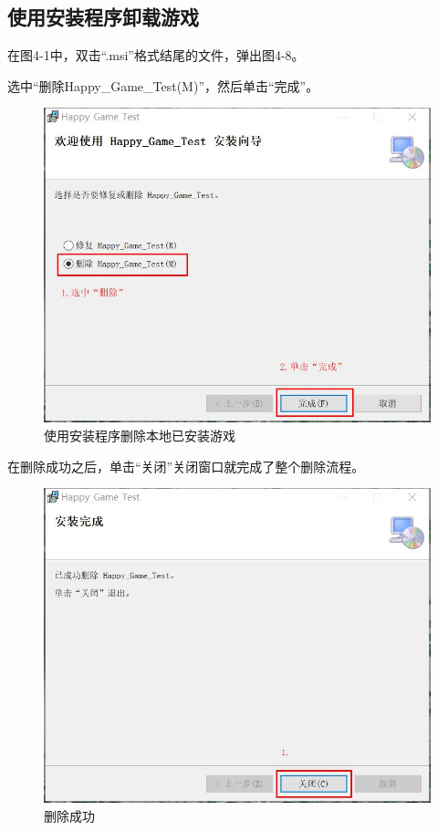 \subsection{使用安装程序卸载游戏}
在图4-1中，双击“.msi”格式结尾的文件，弹出图4-8。
\par
选中“删除Happy\_Game\_Test(M)”，然后单击“完成”。
\par
\begin{figure}[htbp]
    \vspace{13pt} %
    \centering
    \includegraphics[]{images/4-8.jpg}
    \caption{使用安装程序删除本地已安装游戏}%
\end{figure}
\par
在删除成功之后，单击“关闭”关闭窗口就完成了整个删除流程。
\par
\begin{figure}[htbp]
    \vspace{13pt} %
    \centering
    \includegraphics[]{images/4-9.jpg}
    \caption{删除成功}%
\end{figure}

